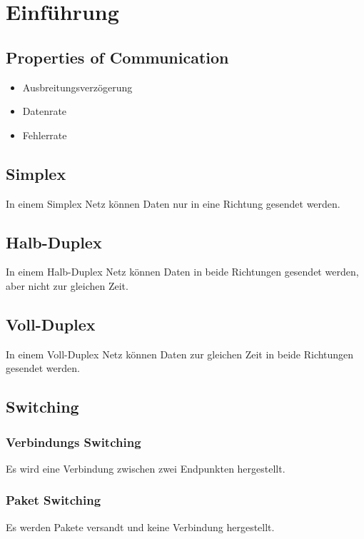 \chapter{Einführung}
    \section{Properties of Communication} %
        \begin{itemize}
        	\item Ausbreitungsverzögerung
        	\item Datenrate
        	\item Fehlerrate
        \end{itemize}

    \section{Simplex}
        In einem Simplex Netz können Daten nur in eine Richtung gesendet werden.

    \section{Halb-Duplex}
        In einem Halb-Duplex Netz können Daten in beide Richtungen gesendet werden, aber nicht zur gleichen Zeit.

    \section{Voll-Duplex}
        In einem Voll-Duplex Netz können Daten zur gleichen Zeit in beide Richtungen gesendet werden.

    \section{Switching}
        \subsection{Verbindungs Switching}
            Es wird eine Verbindung zwischen zwei Endpunkten hergestellt.

        \subsection{Paket Switching}
            Es werden Pakete versandt und keine Verbindung hergestellt.


